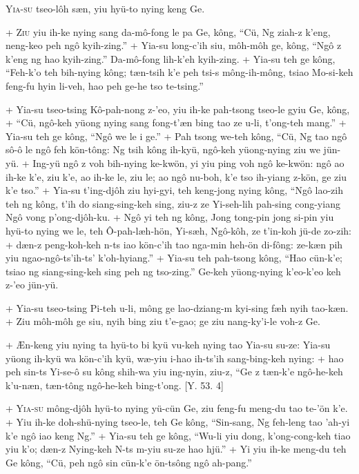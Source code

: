 \header
\lettrine{Y}{ia-su} tseo-lôh sæn, yiu hyü-to nying keng Ge.
\par
\hspace{1ex}
+	\textsc{Ziu} yiu ih-ke nying sang da-mô-fong le pa Ge, kông, ``Cü, Ng ziah-z k'eng, neng-keo peh ngô kyih-zing.''
+	Yia-su long-c'ih siu, môh-môh ge, kông, ``Ngô z k'eng ng hao kyih-zing.'' Da-mô-fong lih-k'eh kyih-zing.
+	Yia-su teh ge kông, ``Feh-k'o teh bih-nying kông; tæn-tsih k'e peh tsi-s mông-ih-mông, tsiao Mo-si-keh feng-fu hyin li-veh, hao peh ge-he tso te-tsing.''
\par
+	Yia-su tseo-tsing Kô-pah-nong z-'eo, yiu ih-ke pah-tsong tseo-le gyiu Ge, kông,
+	``Cü, ngô-keh yüong nying sang fong-t'æn bing tao ze u-li, t'ong-teh mang.''
+	Yia-su teh ge kông, ``Ngô we le i ge.''
+	Pah tsong we-teh kông, ``Cü, Ng tao ngô sô-ô le ngô feh kön-tông: Ng tsih kông ih-kyü, ngô-keh yüong-nying ziu we jün-yü.
+	Ing-yü ngô z voh bih-nying ke-kwön, yi yiu ping voh ngô ke-kwön: ngô ao ih-ke k'e, ziu k'e, ao ih-ke le, ziu le; ao ngô nu-boh, k'e tso ih-yiang z-kön, ge ziu k'e tso.''
+	Yia-su t'ing-djôh ziu hyi-gyi, teh keng-jong nying kông, ``Ngô lao-zih teh ng kông, t'ih do siang-sing-keh sing, ziu-z ze Yi-seh-lih pah-sing cong-yiang Ngô vong p'ong-djôh-ku.
+	Ngô yi teh ng kông, Jong tong-pin jong si-pin yiu hyü-to nying we le, teh Ô-pah-læh-hön, Yi-sæh, Ngô-kôh, ze t'in-koh jü-de zo-zih:
+	dæn-z peng-koh-keh n-ts iao kön-c'ih tao nga-min heh-ön di-fông: ze-kæn pih yiu ngao-ngô-ts'ih-ts' k'oh-hyiang.''
+	Yia-su teh pah-tsong kông, ``Hao cün-k'e; tsiao ng siang-sing-keh sing peh ng tso-zing.'' Ge-keh yüong-nying k'eo-k'eo keh z-'eo jün-yü.
\par
+	Yia-su tseo-tsing Pi-teh u-li, mông ge lao-dziang-m kyi-sing fæh nyih tao-kæn.
+	Ziu môh-môh ge siu, nyih bing ziu t'e-gao; ge ziu nang-ky'i-le voh-z Ge.
\par
+	Æn-keng yiu nying ta hyü-to bi kyü vu-keh nying tao Yia-su su-ze: Yia-su yüong ih-kyü wa kön-c'ih kyü, wæ-yiu i-hao ih-ts'ih sang-bing-keh nying:
+	hao peh sin-ts Yi-se-ô su kông shih-wa yiu ing-nyin, ziu-z, ``Ge z tæn-k'e ngô-he-keh k'u-næn, tæn-tông ngô-he-keh bing-t'ong. [Y. 53. 4]
\par
+	\textsc{Yia-su} mông-djôh hyü-to nying yü-cün Ge, ziu feng-fu meng-du tao te-'ön k'e.
+	Yiu ih-ke doh-shü-nying tseo-le, teh Ge kông, ``Sin-sang, Ng feh-leng tao 'ah-yi k'e ngô iao keng Ng.''
+	Yia-su teh ge kông, ``Wu-li yiu dong, k'ong-cong-keh tiao yiu k'o; dæn-z Nying-keh N-ts m-yiu su-ze hao hjü.''
+	Yi yiu ih-ke meng-du teh Ge kông, ``Cü, peh ngô sin cün-k'e ön-tsông ngô ah-pang.''
